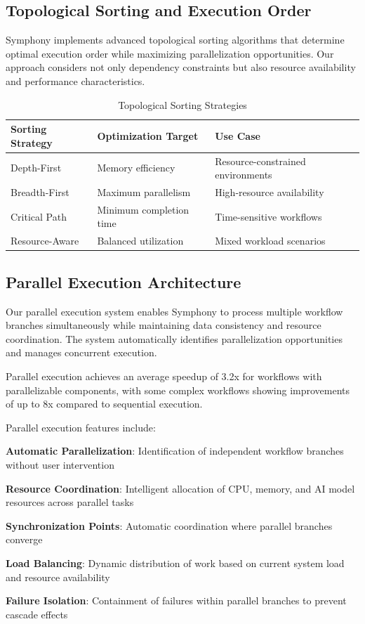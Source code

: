\subsection*{Topological Sorting and Execution Order}

Symphony implements advanced topological sorting algorithms that determine optimal execution order while maximizing parallelization opportunities. Our approach considers not only dependency constraints but also resource availability and performance characteristics.

\begin{table}[ht]
\centering
\begin{tabular}{@{}lll@{}}
\toprule
\textbf{Sorting Strategy} & \textbf{Optimization Target} & \textbf{Use Case} \\
\midrule
Depth-First & Memory efficiency & Resource-constrained environments \\
Breadth-First & Maximum parallelism & High-resource availability \\
Critical Path & Minimum completion time & Time-sensitive workflows \\
Resource-Aware & Balanced utilization & Mixed workload scenarios \\
\bottomrule
\end{tabular}
\caption{Topological Sorting Strategies}
\end{table}

\subsection*{Parallel Execution Architecture}

Our parallel execution system enables Symphony to process multiple workflow branches simultaneously while maintaining data consistency and resource coordination. The system automatically identifies parallelization opportunities and manages concurrent execution.

\begin{alertbox}
Parallel execution achieves an average speedup of 3.2x for workflows with parallelizable components, with some complex workflows showing improvements of up to 8x compared to sequential execution.
\end{alertbox}

Parallel execution features include:

\begin{expandedlist}
    \item \textbf{Automatic Parallelization}: Identification of independent workflow branches without user intervention
    \item \textbf{Resource Coordination}: Intelligent allocation of CPU, memory, and AI model resources across parallel tasks
    \item \textbf{Synchronization Points}: Automatic coordination where parallel branches converge
    \item \textbf{Load Balancing}: Dynamic distribution of work based on current system load and resource availability
    \item \textbf{Failure Isolation}: Containment of failures within parallel branches to prevent cascade effects
\end{expandedlist}

